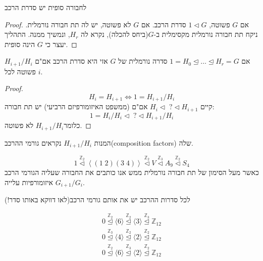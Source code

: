 \documentclass{tstextbook}
\begin{document}
\begin{proposition}
לחבורה סופית יש סדרת הרכב

\end{proposition}
\begin{proof}
אם \(G\) פשוטה, \(1\triangleleft G\) סדרת הרכב. אם \(G\) לא פשוטה, יש לה תת חבורה נורמלית. ניקח תת חבורה נורמלית מקסימלית ב-\(G\)(ביחס להכלה), נקרא לה \(H_{r}\), ונמשיך ממנה. התהליך יעצר כי \(G\) הינה סופית.

\end{proof}
\begin{proposition}
אם \(1=H_{0}\trianglelefteq \dots \trianglelefteq H_{r}=G\) סדרה נורמלית של \(G\) אזי היא סדרת הרכב אם"ם \(H_{i+1}/ H_{i}\) פשוטה לכל \(i\).

\end{proposition}
\begin{proof}
$$H_{i}=H_{i+1}\iff 1=H_{i+1} / H_{i}$$
קיים \(H_{i}\triangleleft \;?\triangleleft H_{i+1}\) אם"ם (ממשפט האיזומורפיזם הרביעי) יש תת חבורה:
$$1=H_{i }/ H_{i} \triangleleft \;?\triangleleft H_{i+1} / H_{i}$$
כלומר\(H_{i+1} / H_{i}\) לא פשוטה.

\end{proof}
\begin{definition}
המנות \(H_{i+1} / H_{i}\) נקראים גורמי ההרכב(composition factors) שלה.

\end{definition}
\begin{example}
$$1 \overset{ \mathbb{Z} _{2} }{ \triangleleft }\left\langle  \left( 1\; 2\right)(3\;4) \right\rangle \overset{ \mathbb{Z} _{2} }{ \triangleleft }V\overset{ \mathbb{Z} _{3} }{ \triangleleft } A_{9}\overset{ \mathbb{Z} _{2} }{ \triangleleft } S_{4}$$
כאשר מעל הסימון של תת חבורה נורמלית ממש אנו כותבים את החבורה שעליה הגורמי הרכב \(G_{i+1} / G_{i}\) איזומורפיות עלייה.

\end{example}
\begin{theorem}
לכל סדרות ההרכב יש את אותם גורמי הרכב(לאו דווקא באותו סדר!)

\end{theorem}
\begin{example}
$$\begin{gathered}0\stackrel{\mathbb{Z} _{2} }{\trianglelefteq} \langle 6\rangle \stackrel{\mathbb{Z} _{2} }{\trianglelefteq} \langle 3\rangle \stackrel{\mathbb{Z} _{3} }{\trianglelefteq} \mathbb{Z} _{12}\\0\stackrel{\mathbb{Z} _{3} }{\trianglelefteq} \langle 4\rangle \stackrel{\mathbb{Z} _{2} }{\trianglelefteq} \langle 2\rangle \stackrel{\mathbb{Z} _{2} }{\trianglelefteq} \mathbb{Z} _{12}\\0\stackrel{\mathbb{Z} _{2} }{\trianglelefteq} \langle 6\rangle \stackrel{\mathbb{Z} _{3} }{\trianglelefteq} \langle 2\rangle \stackrel{\mathbb{Z} _{2} }{\trianglelefteq} \mathbb{Z} _{12}
\end{gathered}$$

\end{example}
\end{document}
